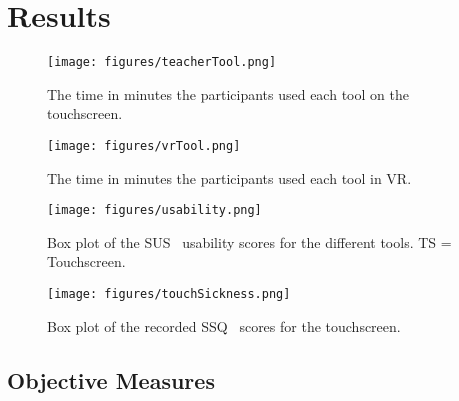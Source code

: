 \section{Results}
\begin{figure}[tb]
    \centering
    \begin{minipage}{0.49\columnwidth}
        \centering
        \texttt{[image: figures/teacherTool.png]}
        \caption{The time in minutes the participants used each tool on the touchscreen.}
        \label{fig:touchToolUsage}
    \end{minipage}
    \hfill
    \begin{minipage}{0.49\columnwidth}
        \centering
        \texttt{[image: figures/vrTool.png]}
        \caption{The time in minutes the participants used each tool in VR.}
        \label{fig:vrToolUsage}
    \end{minipage}
\end{figure}

\begin{figure}[t]
    \centering
    \begin{minipage}{0.49\columnwidth}
        \centering
        \texttt{[image: figures/usability.png]}
        \caption{Box plot of the SUS~\cite{sus} usability scores for the different tools. TS = Touchscreen.}
        \label{fig:usability}
    \end{minipage}
    \hfill
    \begin{minipage}{0.49\columnwidth}
        \centering
        \texttt{[image: figures/touchSickness.png]}
        \vspace{1em}
        \caption{Box plot of the recorded SSQ~\cite{ssqOriginal, ssqFix} scores for the touchscreen.}
        \label{fig:touchSickness}
    \end{minipage}
\end{figure}

\subsection{Objective Measures}

